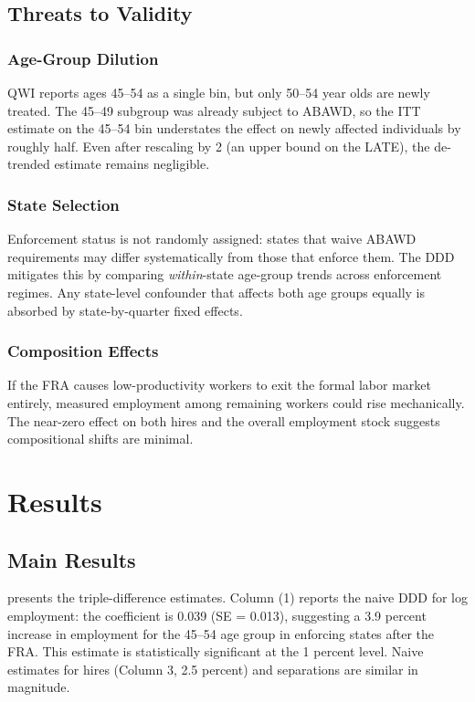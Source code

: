 \documentclass[12pt]{article}
\begin{document}
\subsection{Threats to Validity}

\subsubsection*{Age-Group Dilution} QWI reports ages 45--54 as a single bin, but only 50--54 year olds are newly treated. The 45--49 subgroup was already subject to ABAWD, so the ITT estimate on the 45--54 bin understates the effect on newly affected individuals by roughly half. Even after rescaling by 2 (an upper bound on the LATE), the de-trended estimate remains negligible.

\subsubsection*{State Selection} Enforcement status is not randomly assigned: states that waive ABAWD requirements may differ systematically from those that enforce them. The DDD mitigates this by comparing \textit{within}-state age-group trends across enforcement regimes. Any state-level confounder that affects both age groups equally is absorbed by state-by-quarter fixed effects.

\subsubsection*{Composition Effects} If the FRA causes low-productivity workers to exit the formal labor market entirely, measured employment among remaining workers could rise mechanically. The near-zero effect on both hires and the overall employment stock suggests compositional shifts are minimal.


\section{Results}
\label{sec:results}

\subsection{Main Results}

 presents the triple-difference estimates. Column (1) reports the naive DDD for log employment: the coefficient is 0.039 (SE = 0.013), suggesting a 3.9 percent increase in employment for the 45--54 age group in enforcing states after the FRA. This estimate is statistically significant at the 1 percent level. Naive estimates for hires (Column 3, 2.5 percent) and separations are similar in magnitude.
\end{document}
